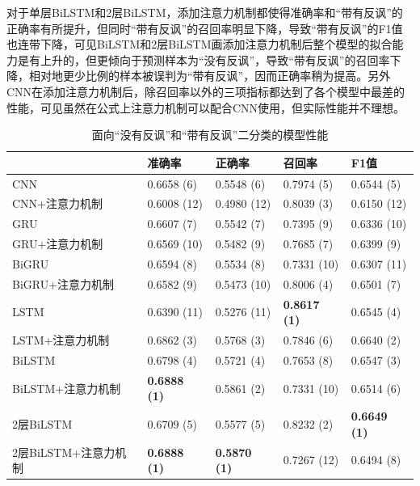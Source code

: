 对于单层BiLSTM和2层BiLSTM，添加注意力机制都使得准确率和“带有反讽”的正确率有所提升，但同时“带有反讽”的召回率明显下降，导致“带有反讽”的F1值也连带下降，可见BiLSTM和2层BiLSTM画添加注意力机制后整个模型的拟合能力是有上升的，但更倾向于预测样本为“没有反讽”，导致“带有反讽”的召回率下降，相对地更少比例的样本被误判为“带有反讽”，因而正确率稍为提高。另外CNN在添加注意力机制后，除召回率以外的三项指标都达到了各个模型中最差的性能，可见虽然在公式上注意力机制可以配合CNN使用，但实际性能并不理想。

\begin{table}[htb]
  \centering
  \begin{minipage}[t]{\linewidth}
  \caption{面向“没有反讽”和“带有反讽”二分类的模型性能}
  \label{tab:exp_irony_det_A_single_result}
    \begin{tabularx}{\linewidth}{X|llll}
    \toprule[1.5pt]
    & 准确率 & 正确率 & 召回率 & F1值 \\
    \hline
    CNN & 0.6658 (6) & 0.5548 (6) & 0.7974 (5) & 0.6544 (5) \\ %
    CNN+注意力机制 & 0.6008 (12) & 0.4980 (12) & 0.8039 (3) & 0.6150 (12) \\  %
    \hline
    GRU & 0.6607 (7) & 0.5542 (7) & 0.7395 (9) & 0.6336 (10) \\ %
    GRU+注意力机制 & 0.6569 (10) & 0.5482 (9) & 0.7685 (7) & 0.6399 (9) \\ %
    \hline
    BiGRU & 0.6594 (8) & 0.5534 (8) & 0.7331 (10) & 0.6307 (11) \\ %
    BiGRU+注意力机制 & 0.6582 (9) & 0.5473 (10) & 0.8006 (4) & 0.6501 (7) \\ %
    \hline
    LSTM & 0.6390 (11) & 0.5276 (11) & \bf 0.8617 (1) & 0.6545 (4) \\ %
    LSTM+注意力机制 & 0.6862 (3) & 0.5768 (3) & 0.7846 (6) & 0.6640 (2) \\ %
    \hline
    BiLSTM & 0.6798 (4) & 0.5721 (4) & 0.7653 (8) & 0.6547 (3) \\ %
    BiLSTM+注意力机制 & \bf 0.6888 (1) & 0.5861 (2) & 0.7331 (10) & 0.6514 (6) \\ %
    \hline
    2层BiLSTM & 0.6709 (5) & 0.5577 (5) & 0.8232 (2) & \bf 0.6649 (1) \\ %
    2层BiLSTM+注意力机制 & \bf 0.6888 (1) & \bf 0.5870 (1) & 0.7267 (12) & 0.6494 (8) \\ %
    \bottomrule[1.5pt]
    \end{tabularx}
  \end{minipage}
\end{table}

